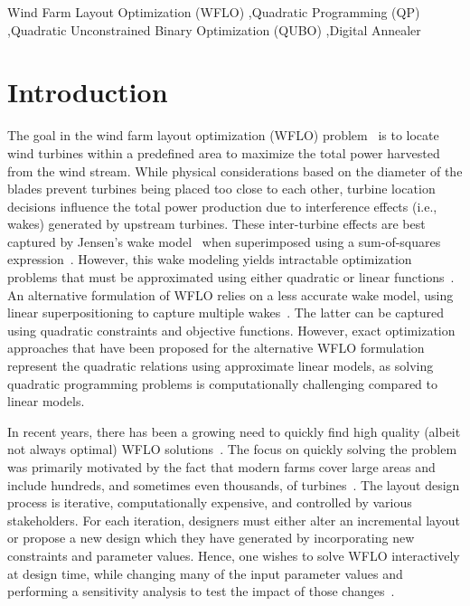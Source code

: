 \documentclass[preprint,12pt]{elsarticle}
\begin{document}
\begin{keyword}
	Wind Farm Layout Optimization (WFLO) \sep Quadratic Programming (QP) \sep Quadratic Unconstrained Binary Optimization (QUBO) \sep Digital Annealer
\end{keyword}

\maketitle 

\section{Introduction}
The goal in the wind farm layout optimization (WFLO)
problem~\cite{MOSETTI1994105} is to locate wind turbines within a
predefined area to maximize the total power harvested from the wind
stream.  While physical considerations based on the diameter of the
blades prevent turbines being placed too close to each other, turbine
location decisions influence the total power production due to
interference effects (i.e., wakes) generated by upstream turbines.
These inter-turbine effects are best captured by Jensen's wake model~\cite{jensen1983note} when superimposed
using a sum-of-squares expression~\cite{Zhang2014}. However,
this wake modeling yields intractable optimization problems
that must be approximated using either quadratic or linear functions~\cite{turner2014new}.
An alternative formulation of WFLO relies on a less accurate wake model, using linear superpositioning
to capture multiple wakes~\cite{donovan2005wind}.
The latter can be captured using quadratic
constraints and objective functions. However, exact optimization
approaches that have been proposed for the alternative WFLO formulation~\cite{Zhang2014,kuo2016wind,donovan2005wind,fagerfjall2010optimizing,archer2011wind,sorkhabi2018constrained}
represent the quadratic relations using approximate linear models,
as solving quadratic programming problems
is computationally challenging compared to linear models.

In recent years, there has been a growing need to quickly find high quality (albeit not always optimal) WFLO solutions~\cite{wilson2014continuous}.
The focus on quickly solving the problem was primarily motivated by the fact
that modern farms cover large areas and include hundreds, and
sometimes even thousands, of turbines~\cite{wilson2013learning}. The layout design
process is iterative, computationally expensive, and controlled
by various stakeholders. For each iteration, designers must either
alter an incremental layout or propose a new design
which they have generated by incorporating new constraints and parameter values.
Hence,
one wishes
to solve WFLO interactively at design time, while changing 
many of the input parameter values
and performing a sensitivity analysis to test the impact of those changes~\cite{wilson2018evolutionary}.
\end{document}
